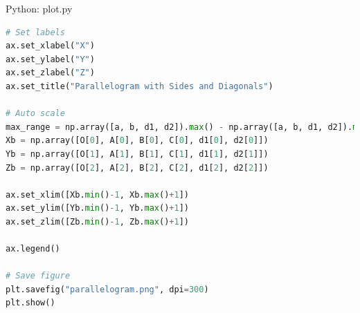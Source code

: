 \documentclass{beamer}
\numberwithin{equation}{section}
\theoremstyle{remark}
\begin{document}
\begin{frame}[fragile]{Python: plot.py}
\begin{lstlisting}[language=Python]
# Set labels
ax.set_xlabel("X")
ax.set_ylabel("Y")
ax.set_zlabel("Z")
ax.set_title("Parallelogram with Sides and Diagonals")

# Auto scale
max_range = np.array([a, b, d1, d2]).max() - np.array([a, b, d1, d2]).min()
Xb = np.array([O[0], A[0], B[0], C[0], d1[0], d2[0]])
Yb = np.array([O[1], A[1], B[1], C[1], d1[1], d2[1]])
Zb = np.array([O[2], A[2], B[2], C[2], d1[2], d2[2]])

ax.set_xlim([Xb.min()-1, Xb.max()+1])
ax.set_ylim([Yb.min()-1, Yb.max()+1])
ax.set_zlim([Zb.min()-1, Zb.max()+1])

ax.legend()

# Save figure
plt.savefig("parallelogram.png", dpi=300)
plt.show()
 \end{lstlisting}
\end{frame}   
\end{document}

